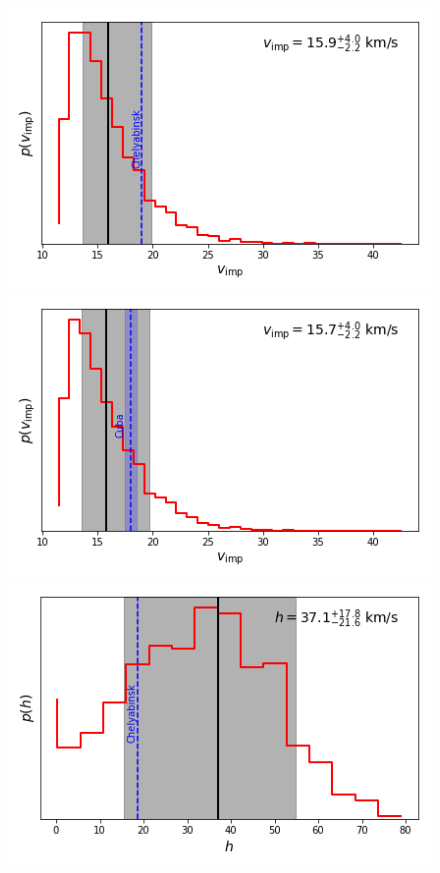 \documentclass[fleqn,usenatbib]{mnras}
\begin{document}
\begin{figure}
  \centering
  \vspace{0.2cm}
   \includegraphics[scale=0.38]{vimp-ppd-Chelyabinsk.png}\hspace{0.1em}%
   \includegraphics[scale=0.38]{vimp-ppd-Cuba.png}
   \\
   \includegraphics[scale=0.38]{h-ppd-Chelyabinsk.png}\hspace{0.1em}%

\end{figure}
\end{document}
